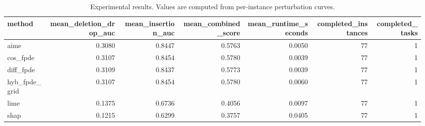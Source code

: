 \begin{table}[t]
\caption{Experimental results. Values are computed from per-instance perturbation curves.}
\label{tab:main_results_computed}
\centering
\begin{tabular}{lrrrrrr}
\toprule
method & mean\_deletion\_drop\_auc & mean\_insertion\_auc & mean\_combined\_score & mean\_runtime\_seconds & completed\_instances & completed\_tasks \\
\midrule
aime & 0.3080 & 0.8447 & 0.5763 & 0.0050 & 77 & 1 \\
cos\_fpde & 0.3107 & 0.8454 & 0.5780 & 0.0039 & 77 & 1 \\
diff\_fpde & 0.3109 & 0.8437 & 0.5773 & 0.0039 & 77 & 1 \\
hyb\_fpde\_grid & 0.3107 & 0.8454 & 0.5780 & 0.0060 & 77 & 1 \\
lime & 0.1375 & 0.6736 & 0.4056 & 0.0097 & 77 & 1 \\
shap & 0.1215 & 0.6299 & 0.3757 & 0.0405 & 77 & 1 \\
\bottomrule
\end{tabular}

\end{table}
